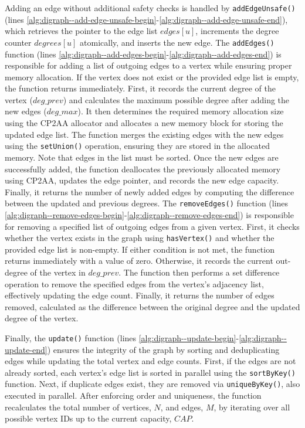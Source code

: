 Adding an edge without additional safety checks is handled by \texttt{addEdgeUnsafe()} (lines \ref{alg:digraph--add-edge-unsafe-begin}-\ref{alg:digraph--add-edge-unsafe-end}), which retrieves the pointer to the edge list $edges[u]$, increments the degree counter $degrees[u]$ atomically, and inserts the new edge.
%
The \texttt{addEdges()} function (lines \ref{alg:digraph--add-edges-begin}-\ref{alg:digraph--add-edges-end}) is responsible for adding a list of outgoing edges to a vertex while ensuring proper memory allocation. If the vertex does not exist or the provided edge list is empty, the function returns immediately. First, it records the current degree of the vertex ($deg\_prev$) and calculates the maximum possible degree after adding the new edges ($deg\_max$). It then determines the required memory allocation size using the CP2AA allocator and allocates a new memory block for storing the updated edge list. The function merges the existing edges with the new edges using the \texttt{setUnion()} operation, ensuring they are stored in the allocated memory. Note that edges in the list must be sorted. Once the new edges are successfully added, the function deallocates the previously allocated memory using CP2AA, updates the edge pointer, and records the new edge capacity. Finally, it returns the number of newly added edges by computing the difference between the updated and previous degrees.
%
The \texttt{removeEdges()} function (lines \ref{alg:digraph--remove-edges-begin}-\ref{alg:digraph--remove-edges-end}) is responsible for removing a specified list of outgoing edges from a given vertex. First, it checks whether the vertex exists in the graph using \texttt{hasVertex()} and whether the provided edge list is non-empty. If either condition is not met, the function returns immediately with a value of zero. Otherwise, it records the current out-degree of the vertex in $deg\_prev$. The function then performs a set difference operation to remove the specified edges from the vertex’s adjacency list, effectively updating the edge count. Finally, it returns the number of edges removed, calculated as the difference between the original degree and the updated degree of the vertex.

Finally, the \texttt{update()} function (lines \ref{alg:digraph--update-begin}-\ref{alg:digraph--update-end}) ensures the integrity of the graph by sorting and deduplicating edges while updating the total vertex and edge counts. First, if the edges are not already sorted, each vertex's edge list is sorted in parallel using the \texttt{sortByKey()} function. Next, if duplicate edges exist, they are removed via \texttt{uniqueByKey()}, also executed in parallel. After enforcing order and uniqueness, the function recalculates the total number of vertices, $N$, and edges, $M$, by iterating over all possible vertex IDs up to the current capacity, $CAP$.

